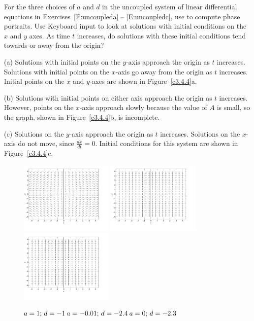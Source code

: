 \documentclass{ximera}
\begin{document}
\begin{computerExercise} \label{c3.4.4}
For the three choices of $a$ and $d$ in the uncoupled system of
linear differential equations in Exercises~\ref{E:uncoupleda} -- 
\ref{E:uncoupledc}, use {\pplane}
to compute phase portraits.  Use {\sf Keyboard input} to look at
solutions with initial conditions on the $x$ and $y$ axes.  As time
$t$ increases, do solutions with these initial conditions tend towards 
or away from the origin?

\begin{solution}

(a) Solutions with initial points on the $y$-axis approach the
origin as $t$ increases.  Solutions with initial points on the
$x$-axis go away from the origin as $t$ increases.  Initial points
on the $x$ and $y$-axes are shown in Figure~\ref{c3.4.4}a.

(b) Solutions with initial points on either axis approach the
origin as $t$ increases.  However, points on the $x$-axis
approach slowly because the value of $A$ is small, so the \Matlab
graph, shown in Figure~\ref{c3.4.4}b, is incomplete.

(c) Solutions on the $y$-axis approach the origin as $t$
increases.  Solutions on the $x$-axis do not move, since
$\frac{dx}{dt} = 0$.  Initial conditions for this system are shown
in Figure~\ref{c3.4.4}c.

\begin{figure}[htb]
                       \centerline{%
                       \includegraphics[width=1.8in]{exfigure/3-4-4a.pdf}
                       \includegraphics[width=1.8in]{exfigure/3-4-4b.pdf}
                       \includegraphics[width=1.8in]{exfigure/3-4-4c.pdf}}
	\centerline{$a = 1\hbox{; }d = -1$\hspace{0.7in}$a = -0.01\hbox{; }d = -2.4$\hspace{0.7in}$a = 0\hbox{; }d = -2.3$}
\end{figure}

\end{solution}
\end{computerExercise}
\end{document}
